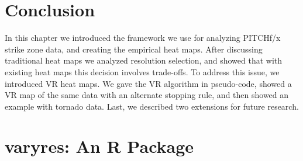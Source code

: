 \section{Conclusion}

In this chapter we introduced the framework we use for analyzing PITCHf/x\textsuperscript{\textregistered} strike zone data, and creating the empirical heat maps. After discussing traditional heat maps we analyzed resolution selection, and showed that with existing heat maps this decision involves trade-offs. To address this issue, we introduced VR heat maps. We gave the VR algorithm in pseudo-code, showed a VR map of the same data with an alternate stopping rule, and then showed an example with tornado data. Last, we described two extensions for future research.

\section{{\bf varyres}: An R Package}